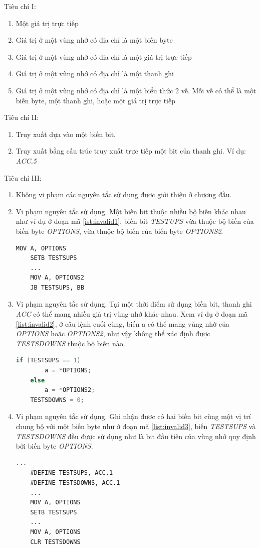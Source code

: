 Tiêu chí I:
\begin{enumerate}
	\item Một giá trị trực tiếp
	\item Giá trị ở một vùng nhớ có địa chỉ là một biến byte
	\item Giá trị ở một vùng nhớ có địa chỉ là một giá trị trực tiếp
	\item Giá trị ở một vùng nhớ có địa chỉ là một thanh ghi
	\item Giá trị ở một vùng nhớ có địa chỉ là một biểu thức 2 vế. Mỗi vế có thể là một biến byte, một thanh ghi, hoặc một giá trị trực tiếp
\end{enumerate}

Tiêu chí II:
\begin{enumerate}
	\item Truy xuất dựa vào một biến bit.
	\item Truy xuất bằng cấu trúc truy xuất trực tiếp một bit của thanh ghi. Ví dụ: \textit{ACC.5}
\end{enumerate}

Tiêu chí III:
\begin{enumerate}
	\item Không vi phạm các nguyên tắc sử dụng được giới thiệu ở chương đầu.
	\item Vi phạm nguyên tắc sử dụng. Một biến bit thuộc nhiều bộ biến khác nhau như ví dụ ở đoạn mã \ref{ist:invalid1}, biến bit \textit{TESTUPS} vừa thuộc bộ biến của biến byte \textit{OPTIONS}, vừa thuộc bộ biến của biến byte \textit{OPTIONS2}.
	\begin{lstlisting}[caption={Đoạn mã có một biến bit thuộc nhiều bộ biến khác nhau},label={list:invalid1}]
	MOV A, OPTIONS
	SETB TESTSUPS
	...
	MOV A, OPTIONS2
	JB TESTSUPS, BB
	\end{lstlisting}
	\item Vi phạm nguyên tắc sử dụng. Tại một thời điểm sử dụng biến bit, thanh ghi \textit{ACC} có thể mang nhiều giá trị vùng nhớ khác nhau. Xem ví dụ ở đoạn mã \ref{list:invalid2}, ở câu lệnh cuối cùng, biến a có thể mang vùng nhớ của \textit{OPTIONS} hoặc \textit{OPTIONS2}, như vậy không thể xác định được \textit{TESTSDOWNS} thuộc bộ biến nào.
	\begin{lstlisting}[caption={Đoạn mã ACC có thể mang nhiều giá trị vùng nhớ khác nhau},label={list:invalid2}, language=c++]
	if (TESTSUPS == 1)
		a = *OPTIONS;
	else
		a = *OPTIONS2;
	TESTSDOWNS = 0;
	\end{lstlisting}
	\item Vi phạm nguyên tắc sử dụng. Ghi nhận được có hai biến bit cùng một vị trí chung bộ với một biến byte như ở đoạn mã \ref{list:invalid3}, biến \textit{TESTSUPS} và \textit{TESTSDOWNS} đều được sử dụng như là bit đầu tiên của vùng nhớ quy định bởi biến byte \textit{OPTIONS}.
	\begin{lstlisting}[caption={Đoạn mã có 2 biến bit cùng một vị trí và đều được ghi nhận cùng bộ với một biến byte},label={list:invalid3}]
	...
	#DEFINE TESTSUPS, ACC.1
	#DEFINE TESTSDOWNS, ACC.1
	...
	MOV A, OPTIONS
	SETB TESTSUPS
	...
	MOV A, OPTIONS
	CLR TESTSDOWNS
	\end{lstlisting}
\end{enumerate}

